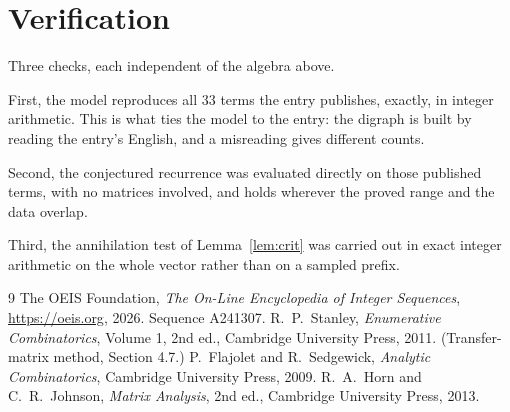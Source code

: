 \documentclass[11pt,a4paper]{article}
\theoremstyle{plain}
\theoremstyle{definition}
\begin{document}
\section{Verification}

Three checks, each independent of the algebra above.

First, the model reproduces all $33$ terms the entry publishes, exactly, in integer
arithmetic. This is what ties the model to the entry: the digraph is built by reading the
entry's English, and a misreading gives different counts.

Second, the conjectured recurrence was evaluated directly on those published terms, with no
matrices involved, and holds wherever the proved range and the data overlap.

Third, the annihilation test of Lemma~\ref{lem:crit} was carried out in exact integer
arithmetic on the whole vector rather than on a sampled prefix.

\begin{thebibliography}{9}
 The OEIS Foundation, \emph{The On-Line Encyclopedia of Integer
Sequences}, \url{https://oeis.org}, 2026. Sequence A241307.
 R.~P.~Stanley, \emph{Enumerative Combinatorics}, Volume 1, 2nd ed.,
Cambridge University Press, 2011. (Transfer-matrix method, Section 4.7.)
 P.~Flajolet and R.~Sedgewick, \emph{Analytic Combinatorics}, Cambridge
University Press, 2009.
 R.~A.~Horn and C.~R.~Johnson, \emph{Matrix Analysis}, 2nd ed., Cambridge
University Press, 2013.
\end{thebibliography}
\end{document}

